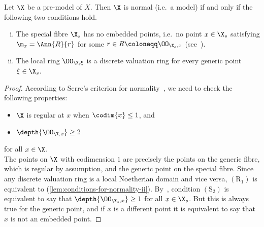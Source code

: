 \begin{lemma}\label{lem:conditions-for-normality}
    Let $\X$ be a pre-model of $X$.
    Then $\X$ is normal (i.e.\ a model) if and only if the following two conditions hold.
    \begin{enumerate}[(i)]
        \item The special fibre $\X_s$ has no embedded points, i.e.\ no point $x\in \X_s$ \label{lem:conditions-for-normality-i}
            satisfying $\m_x = \Ann{R}{r}$ for some $r\in R \coloneqq \OO_{\X_s,x}$ (see~\cite[Definition 7.1.6]{Liu}).
        \item The local ring $\OO_{\X,\xi}$ is a discrete valuation ring for every generic point $\xi \in \X_s$. \label{lem:conditions-for-normality-ii}
    \end{enumerate}
\end{lemma}

\begin{proof}
    According to Serre's criterion for normality~\cite[Theorem 8.2.23]{Liu},
    we need to check the following properties:
    \begin{itemize}
        \item[$(\mathrm{R}_1)$] $\X$ is regular at $x$ when $\codim{x} \leq 1$, and
        \item[$(\mathrm{S}_2)$] $\depth{\OO_{\X,x}} \geq 2$
    \end{itemize}
    for all $x\in \X$. \\
    The points on $\X$ with codimension $1$ are precisely the points on the generic fibre, which is regular by assumption,
    and the generic point on the special fibre.
    Since any discrete valuation ring is a local Noetherian domain and vice versa, $(\mathrm{R}_1)$ is
    equivalent to (\ref{lem:conditions-for-normality-ii}).
    By~\cite[Proposition 8.2.11]{Liu}, condition $(\mathrm{S}_2)$ is equivalent to say
    that $\depth{\OO_{\X_s, x}} \geq 1$ for all $x \in \X_s$.
    But this is always true for the generic point, and if $x$ is a different point it is equivalent to say that $x$ is not an embedded point.
\end{proof}

